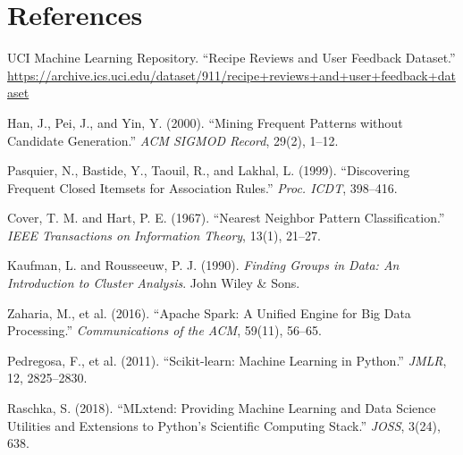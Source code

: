 \documentclass[12pt,a4paper]{article}
\begin{document}
\section*{References}

\begin{enumerate}[label={[\arabic*]}, nosep]
    \item UCI Machine Learning Repository. ``Recipe Reviews and User Feedback Dataset.'' \url{https://archive.ics.uci.edu/dataset/911/recipe+reviews+and+user+feedback+dataset}
    \item Han, J., Pei, J., and Yin, Y. (2000). ``Mining Frequent Patterns without Candidate Generation.'' \textit{ACM SIGMOD Record}, 29(2), 1--12.
    \item Pasquier, N., Bastide, Y., Taouil, R., and Lakhal, L. (1999). ``Discovering Frequent Closed Itemsets for Association Rules.'' \textit{Proc. ICDT}, 398--416.
    \item Cover, T. M. and Hart, P. E. (1967). ``Nearest Neighbor Pattern Classification.'' \textit{IEEE Transactions on Information Theory}, 13(1), 21--27.
    \item Kaufman, L. and Rousseeuw, P. J. (1990). \textit{Finding Groups in Data: An Introduction to Cluster Analysis}. John Wiley \& Sons.
    \item Zaharia, M., et al. (2016). ``Apache Spark: A Unified Engine for Big Data Processing.'' \textit{Communications of the ACM}, 59(11), 56--65.
    \item Pedregosa, F., et al. (2011). ``Scikit-learn: Machine Learning in Python.'' \textit{JMLR}, 12, 2825--2830.
    \item Raschka, S. (2018). ``MLxtend: Providing Machine Learning and Data Science Utilities and Extensions to Python's Scientific Computing Stack.'' \textit{JOSS}, 3(24), 638.
\end{enumerate}
\end{document}
